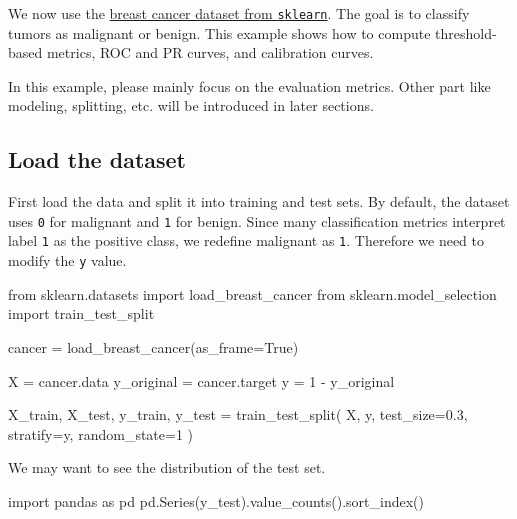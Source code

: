 \documentclass[
  letterpaper,
  DIV=11,
  numbers=noendperiod]{scrreprt}
\newenvironment{Shaded}{\begin{snugshade}}{\end{snugshade}}
\newcommand{\DecValTok}[1]{\textcolor[rgb]{0.68,0.00,0.00}{#1}}
\newcommand{\FloatTok}[1]{\textcolor[rgb]{0.68,0.00,0.00}{#1}}
\newcommand{\ImportTok}[1]{\textcolor[rgb]{0.00,0.46,0.62}{#1}}
\newcommand{\NormalTok}[1]{\textcolor[rgb]{0.00,0.23,0.31}{#1}}
\newcommand{\OperatorTok}[1]{\textcolor[rgb]{0.37,0.37,0.37}{#1}}
\newcommand{\VariableTok}[1]{\textcolor[rgb]{0.07,0.07,0.07}{#1}}
\theoremstyle{definition}
\theoremstyle{definition}
\theoremstyle{plain}
\theoremstyle{plain}
\theoremstyle{remark}
\begin{document}
We now use the
\href{https://scikit-learn.org/stable/modules/generated/sklearn.datasets.load_breast_cancer.html}{breast
cancer dataset from \texttt{sklearn}}. The goal is to classify tumors as
malignant or benign. This example shows how to compute threshold-based
metrics, ROC and PR curves, and calibration curves.

In this example, please mainly focus on the evaluation metrics. Other
part like modeling, splitting, etc. will be introduced in later
sections.

\subsection{Load the dataset}\label{load-the-dataset}

First load the data and split it into training and test sets. By
default, the dataset uses \texttt{0} for malignant and \texttt{1} for
benign. Since many classification metrics interpret label \texttt{1} as
the positive class, we redefine malignant as \texttt{1}. Therefore we
need to modify the \texttt{y} value.

\begin{Shaded}
\begin{Highlighting}[]
\ImportTok{from}\NormalTok{ sklearn.datasets }\ImportTok{import}\NormalTok{ load\_breast\_cancer}
\ImportTok{from}\NormalTok{ sklearn.model\_selection }\ImportTok{import}\NormalTok{ train\_test\_split}

\NormalTok{cancer }\OperatorTok{=}\NormalTok{ load\_breast\_cancer(as\_frame}\OperatorTok{=}\VariableTok{True}\NormalTok{)}

\NormalTok{X }\OperatorTok{=}\NormalTok{ cancer.data}
\NormalTok{y\_original }\OperatorTok{=}\NormalTok{ cancer.target}
\NormalTok{y }\OperatorTok{=} \DecValTok{1} \OperatorTok{{-}}\NormalTok{ y\_original}

\NormalTok{X\_train, X\_test, y\_train, y\_test }\OperatorTok{=}\NormalTok{ train\_test\_split(}
\NormalTok{    X, y, test\_size}\OperatorTok{=}\FloatTok{0.3}\NormalTok{, stratify}\OperatorTok{=}\NormalTok{y, random\_state}\OperatorTok{=}\DecValTok{1}
\NormalTok{)}
\end{Highlighting}
\end{Shaded}

We may want to see the distribution of the test set.

\begin{Shaded}
\begin{Highlighting}[]
\ImportTok{import}\NormalTok{ pandas }\ImportTok{as}\NormalTok{ pd}
\NormalTok{pd.Series(y\_test).value\_counts().sort\_index()}
\end{Highlighting}
\end{Shaded}
\end{document}
